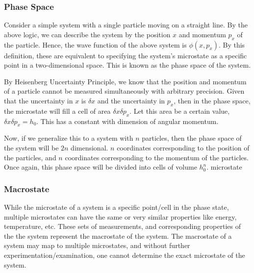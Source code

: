 \documentclass[12pt, oneside]{book}
\begin{document}
\subsubsection{Phase Space}
Consider a simple system with a single particle moving on a straight line.
By the above logic, we can describe the system by the position \(x\) and momentum \(p_x\) of the particle.
Hence, the wave function of the above system is \(\phi(x, p_x)\).
By this definition, these are equivalent to specifying the system's microstate as a specific point in a two-dimensional space.
This is known as the phase space of the system.

By Heisenberg Uncertainty Principle, we know that the position and momentum of a particle cannot be measured simultaneously with arbitrary precision.
Given that the uncertainty in \(x\) is \(\delta x\) and the uncertainty in \(p_x\), then in the phase space, the microstate will fill a cell of area \( \delta x \delta p_x\).
Let this area be a certain value, \( \delta x \delta p_x = h_0\).
This has a constant with dimension of angular momentum.

Now, if we generalize this to a system with \(n\) particles, then the phase space of the system will be \(2n\) dimensional.
\(n\) coordinates corresponding to the position of the particles, and \(n\) coordinates corresponding to the momentum of the particles.
Once again, this phase space will be divided into cells of volume \(h_0^n\).
microstate 
\subsubsection{Macrostate}
While the microstate of a system is a specific point/cell in the phase state, multiple microstates can have the same or very similar properties like energy, temperature, etc.
These sets of measurements, and corresponding properties of the the system represent the macrostate of the system.
The macrostate of a system may map to multiple microstates, and without further experimentation/examination, one cannot determine the exact microstate of the system.
\end{document}
